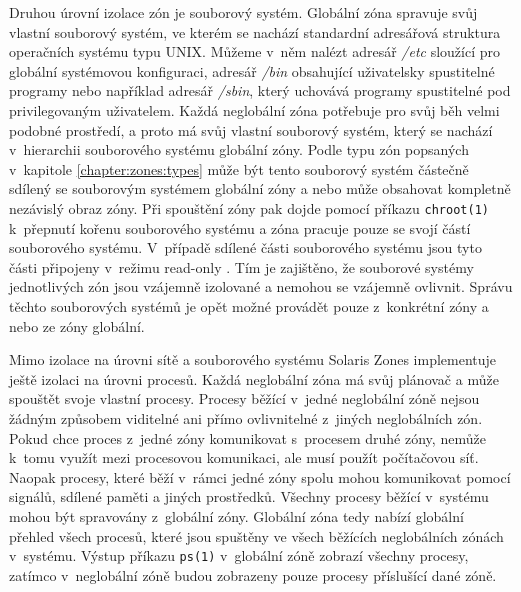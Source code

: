 Druhou úrovní izolace zón je souborový systém. Globální zóna spravuje svůj vlastní souborový systém, ve kterém se nachází
standardní adresářová struktura operačních systému typu UNIX. Můžeme v~něm nalézt adresář \textit{/etc} sloužící pro globální
systémovou konfiguraci, adresář \textit{/bin} obsahující uživatelsky spustitelné programy nebo například adresář \textit{/sbin},
který uchovává programy spustitelné pod privilegovaným uživatelem. Každá neglobální zóna potřebuje pro svůj běh velmi podobné
prostředí, a proto má svůj vlastní souborový systém, který se nachází v~hierarchii souborového systému globální zóny.
Podle typu zón popsaných v~kapitole \ref{chapter:zones:types} může být tento souborový systém částečně sdílený se souborovým
systémem globální zóny a nebo může obsahovat kompletně nezávislý obraz zóny. Při spouštění zóny pak dojde pomocí příkazu
\verb|chroot(1)| k~přepnutí kořenu souborového systému a zóna pracuje pouze se svojí částí souborového systému. V~případě 
sdílené části souborového systému jsou tyto části připojeny v~režimu read-only \cite{cvut:presentation:virt1}. Tím je zajištěno,
že souborové systémy jednotlivých zón jsou vzájemně izolované a nemohou se vzájemně ovlivnit. Správu těchto souborových systémů
je opět možné provádět pouze z~konkrétní zóny a nebo ze zóny globální.

Mimo izolace na úrovni sítě a souborového systému Solaris Zones implementuje ještě izolaci na úrovni procesů. Každá neglobální
zóna má svůj plánovač a může spouštět svoje vlastní procesy. Procesy běžící v~jedné neglobální zóně nejsou žádným způsobem 
viditelné ani přímo ovlivnitelné z~jiných neglobálních zón. Pokud chce proces z~jedné zóny komunikovat s~procesem druhé zóny,
nemůže k~tomu využít mezi procesovou komunikaci, ale musí použít počítačovou síť. Naopak procesy, které běží v~rámci jedné
zóny spolu mohou komunikovat pomocí signálů, sdílené paměti a jiných prostředků. Všechny procesy běžící v~systému mohou být
spravovány z~globální zóny. Globální zóna tedy nabízí globální přehled všech procesů, které jsou spuštěny ve všech běžících
neglobálních zónách v~systému. Výstup příkazu \verb|ps(1)| v~globální zóně zobrazí všechny procesy, zatímco v~neglobální zóně
budou zobrazeny pouze procesy příslušící dané zóně.
